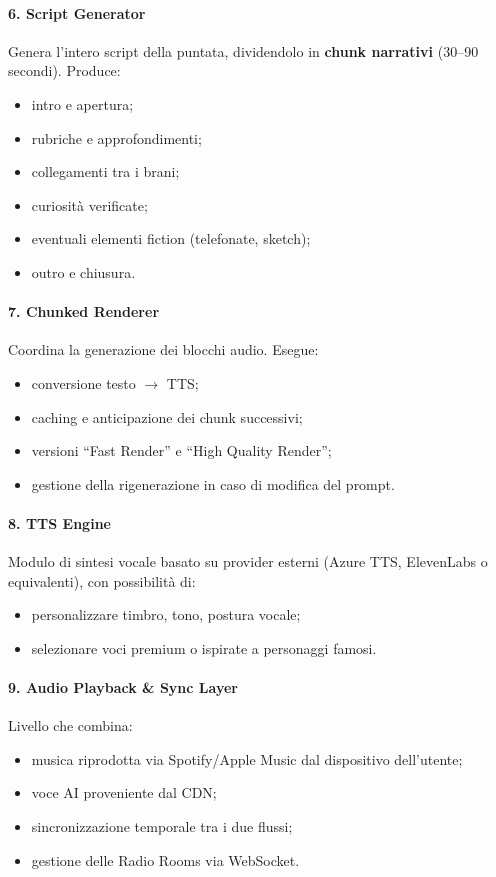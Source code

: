\documentclass[11pt,a4paper]{article}
\begin{document}
\paragraph{6. Script Generator}
Genera l’intero script della puntata, dividendolo in \textbf{chunk narrativi} (30–90 secondi).  
Produce:
\begin{itemize}
    \item intro e apertura;
    \item rubriche e approfondimenti;
    \item collegamenti tra i brani;
    \item curiosità verificate;
    \item eventuali elementi fiction (telefonate, sketch);
    \item outro e chiusura.
\end{itemize}

\paragraph{7. Chunked Renderer}
Coordina la generazione dei blocchi audio.  
Esegue:
\begin{itemize}
    \item conversione testo $\rightarrow$ TTS;
    \item caching e anticipazione dei chunk successivi;
    \item versioni “Fast Render” e “High Quality Render”;
    \item gestione della rigenerazione in caso di modifica del prompt.
\end{itemize}

\paragraph{8. TTS Engine}
Modulo di sintesi vocale basato su provider esterni (Azure TTS, ElevenLabs o equivalenti), con possibilità di:
\begin{itemize}
    \item personalizzare timbro, tono, postura vocale;
    \item selezionare voci premium o ispirate a personaggi famosi.
\end{itemize}

\paragraph{9. Audio Playback \& Sync Layer}
Livello che combina:
\begin{itemize}
    \item musica riprodotta via Spotify/Apple Music dal dispositivo dell’utente;
    \item voce AI proveniente dal CDN;
    \item sincronizzazione temporale tra i due flussi;
    \item gestione delle Radio Rooms via WebSocket.
\end{itemize}
\end{document}
